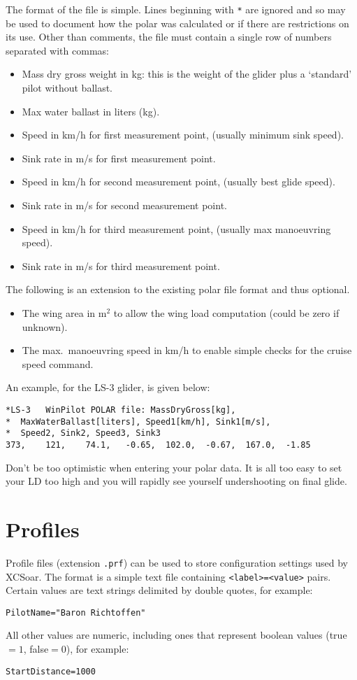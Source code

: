 The format of the file is simple.  Lines beginning with \verb|*| are
ignored and so may be used to document how the polar was calculated or
if there are restrictions on its use.  Other than comments, the file
must contain a single row of numbers separated with commas:
\begin{itemize}
\item Mass dry gross weight in kg: this is the weight of the glider plus
  a `standard' pilot without ballast.
\item Max water ballast in liters (kg).
\item Speed in km/h for first measurement point, (usually minimum sink speed).
\item Sink rate in m/s for first measurement point.
\item Speed in km/h for second measurement point, (usually best glide speed).
\item Sink rate in m/s for second measurement point.
\item Speed in km/h for third measurement point, (usually max manoeuvring speed).
\item Sink rate in m/s for third measurement point.
\end{itemize}
The following is an extension to the existing polar file format and thus optional.
\begin{itemize}
\item The wing area in m$^2$ to allow the wing load computation (could be zero if unknown). 
\item The max.\ manoeuvring speed in km/h to enable simple checks for the cruise speed command.
\end{itemize}

An example, for the LS-3 glider, is given below:
\begin{verbatim}
*LS-3	WinPilot POLAR file: MassDryGross[kg], 
*  MaxWaterBallast[liters], Speed1[km/h], Sink1[m/s], 
*  Speed2, Sink2, Speed3, Sink3  	
373,	121,	74.1,	-0.65,	102.0,	-0.67,	167.0,	-1.85
\end{verbatim}

\tip Don't be too optimistic when entering your polar data. It is all too
easy to set your LD too high and you will rapidly see yourself
undershooting on final glide.

\section{Profiles}

Profile files (extension \verb|.prf|) can be used to store
configuration settings used by XCSoar.  The format is a simple text
file containing \verb|<label>=<value>| pairs.  Certain values are text
strings delimited by double quotes, for example:
\begin{verbatim}
PilotName="Baron Richtoffen"
\end{verbatim}
All other values are numeric, including ones that represent boolean
values (true$=1$, false$=0$), for example:
\begin{verbatim}
StartDistance=1000
\end{verbatim}


